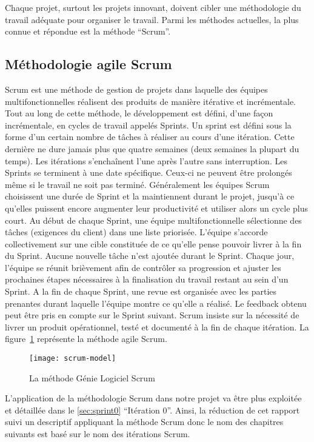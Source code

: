 Chaque projet, surtout les projets innovant, doivent cibler une méthodologie du
travail adéquate pour organiser le travail. Parmi les méthodes actuelles, la
plus connue et répondue est la méthode ``Scrum''.

\subsection{Méthodologie agile Scrum}

Scrum est une méthode de gestion de projets dans laquelle des équipes
multifonctionnelles réalisent des produits de manière itérative et
incrémentale. Tout au long de cette méthode, le développement est défini,
d'une façon incrémentale, en cycles de travail appelés Sprints. Un sprint est
défini sous la forme d'un certain nombre de tâches à réaliser au cours d'une
itération. Cette dernière ne dure jamais plus que quatre semaines (deux
semaines la plupart du temps). Les itérations s'enchaînent l'une après l'autre
sans interruption. Les Sprints se terminent à une date spécifique. Ceux-ci ne
peuvent être prolongés même si le travail ne soit pas terminé. Généralement les
équipes Scrum choisissent une durée de Sprint et la maintiennent durant le
projet, jusqu'à ce qu'elles puissent encore augmenter leur productivité et
utiliser alors un cycle plus court. Au début de chaque Sprint, une équipe
multifonctionnelle sélectionne des tâches
(exigences du client) dans une liste priorisée. L'équipe s'accorde
collectivement sur une cible constituée de ce qu'elle pense pouvoir livrer à la
fin du Sprint. Aucune nouvelle tâche n'est ajoutée durant le Sprint. Chaque
jour, l'équipe se réunit brièvement afin de contrôler sa progression et ajuster
les prochaines étapes nécessaires à la finalisation du travail restant au sein
d'un Sprint. A la fin de chaque Sprint, une revue est organisée avec les
parties prenantes durant laquelle l'équipe montre ce qu'elle a réalisé. Le
feedback obtenu peut être pris en compte sur le Sprint suivant. Scrum insiste
sur la nécessité de livrer un produit opérationnel, testé et documenté à la fin
de chaque itération. La figure~\ref{fig:scrum-model} représente la méthode
agile Scrum.

\begin{figure}[H]
    \centering
    \texttt{[image: scrum-model]}
    \caption{La méthode Génie Logiciel Scrum}
\label{fig:scrum-model}
\end{figure}

L'application de la méthodologie Scrum dans notre projet 
va être plus exploitée et détaillée dans le \autoref{sec:sprint0} ``Itération
0''. Ainsi, la réduction de cet rapport suivi un descriptif appliquant la
méthode Scrum donc le nom des chapitres suivants est basé sur le nom des
itérations Scrum.

